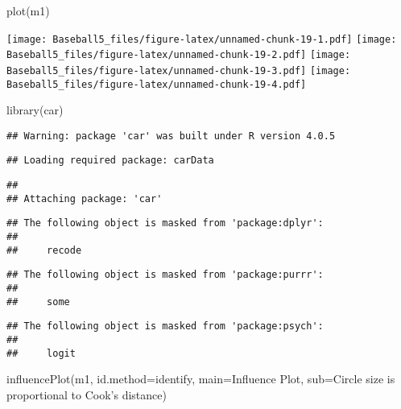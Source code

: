 \documentclass[
]{article}
\newenvironment{Shaded}{\begin{snugshade}}{\end{snugshade}}
\newcommand{\AttributeTok}[1]{\textcolor[rgb]{0.77,0.63,0.00}{#1}}
\newcommand{\FunctionTok}[1]{\textcolor[rgb]{0.00,0.00,0.00}{#1}}
\newcommand{\NormalTok}[1]{#1}
\newcommand{\StringTok}[1]{\textcolor[rgb]{0.31,0.60,0.02}{#1}}
\begin{document}
\begin{Shaded}
\begin{Highlighting}[]
\FunctionTok{plot}\NormalTok{(m1)}
\end{Highlighting}
\end{Shaded}

\texttt{[image: Baseball5\_files/figure-latex/unnamed-chunk-19-1.pdf]}
\texttt{[image: Baseball5\_files/figure-latex/unnamed-chunk-19-2.pdf]}
\texttt{[image: Baseball5\_files/figure-latex/unnamed-chunk-19-3.pdf]}
\texttt{[image: Baseball5\_files/figure-latex/unnamed-chunk-19-4.pdf]}

\begin{Shaded}
\begin{Highlighting}[]
\FunctionTok{library}\NormalTok{(car) }
\end{Highlighting}
\end{Shaded}

\begin{verbatim}
## Warning: package 'car' was built under R version 4.0.5
\end{verbatim}

\begin{verbatim}
## Loading required package: carData
\end{verbatim}

\begin{verbatim}
## 
## Attaching package: 'car'
\end{verbatim}

\begin{verbatim}
## The following object is masked from 'package:dplyr':
## 
##     recode
\end{verbatim}

\begin{verbatim}
## The following object is masked from 'package:purrr':
## 
##     some
\end{verbatim}

\begin{verbatim}
## The following object is masked from 'package:psych':
## 
##     logit
\end{verbatim}

\begin{Shaded}
\begin{Highlighting}[]
\FunctionTok{influencePlot}\NormalTok{(m1, }\AttributeTok{id.method=}\StringTok{\textquotesingle{}identify\textquotesingle{}}\NormalTok{, }\AttributeTok{main=}\StringTok{\textquotesingle{}Influence Plot\textquotesingle{}}\NormalTok{, }\AttributeTok{sub=}\StringTok{\textquotesingle{}Circle size is proportional to Cook’s distance\textquotesingle{}}\NormalTok{)}
\end{Highlighting}
\end{Shaded}
\end{document}

